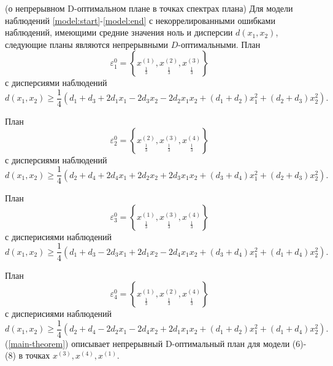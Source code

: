 \begin{theorem}\label{main-theorem}(о непрерывном D-оптимальном плане в точках спектрах плана)
	Для модели наблюдений \eqref{model:start}-\eqref{model:end} с некоррелированными ошибками наблюдений, имеющими средние значения ноль и дисперсии $d(x_1, x_2)$, следующие планы являются непрерывными $D$-оптимальными. План
	\begin{equation} \label{main-theorem:plan-1}
	\varepsilon_1^{0} = \left \{ 
	\underset{\frac 1 3} {x^{(1)}},
	\underset{\frac 1 3} {x^{(2)}},
	\underset{\frac 1 3} {x^{(3)}}
	\right \}
	\end{equation}
	с дисперсиями наблюдений
	\begin{equation}
	d(x_1, x_2) \ge \frac 1 4 (d_1 + d_3 + 2 d_1 x_1 - 2 d_3 x_2 - 2d_2 x_1 x_2 + (d_1 + d_2)x_1^2 + (d_2 + d_3)x_2^2).
	\end{equation}
	
	План
	\begin{equation}
	\varepsilon_2^{0} = \left \{ 
	\underset{\frac 1 3} {x^{(2)}},
	\underset{\frac 1 3} {x^{(3)}},
	\underset{\frac 1 3} {x^{(4)}}
	\right \}
	\end{equation}
	с дисперсиями наблюдений
	\begin{equation}
	d(x_1, x_2) \ge \frac 1 4 (d_2 + d_4 + 2 d_4 x_1 + 2 d_2 x_2 + 2 d_3 x_1 x_2 + (d_3 + d_4)x_1^2 + (d_2 + d_3)x_2^2).
	\end{equation}
	
	План
	\begin{equation}
	\varepsilon_3^{0} = \left \{ 
	\underset{\frac 1 3} {x^{(1)}},
	\underset{\frac 1 3} {x^{(3)}},
	\underset{\frac 1 3} {x^{(4)}}
	\right \}
	\end{equation}
	с дисперисиями наблюдений
	\begin{equation}
	d(x_1, x_2) \ge \frac 1 4 (d_1 + d_3 - 2 d_3 x_1 + 2 d_1 x_2 - 2 d_4 x_1 x_2 + (d_3 + d_4)x_1^2 + (d_1 + d_4)x_2^2).
	\end{equation}
	
	План
	\begin{equation}
	\varepsilon_4^{0} = \left \{ 
	\underset{\frac 1 3} {x^{(1)}},
	\underset{\frac 1 3} {x^{(2)}},
	\underset{\frac 1 3} {x^{(4)}}
	\right \}
	\end{equation}
	с дисперисиями наблюдений
	\begin{equation}
	d(x_1, x_2) \ge \frac 1 4 (d_2 + d_4 - 2 d_2 x_1 - 2 d_4 x_2 + 2 d_1 x_1 x_2 + (d_1 + d_2)x_1^2 + (d_1 + d_4)x_2^2).
	\end{equation}
	(\ref{main-theorem}) описывает непрерывный D-оптимальный план для модели (6)-(8) в точках $x^{(3)}, x^{(4)}, x^{(1)}$.\\
\end{theorem}
